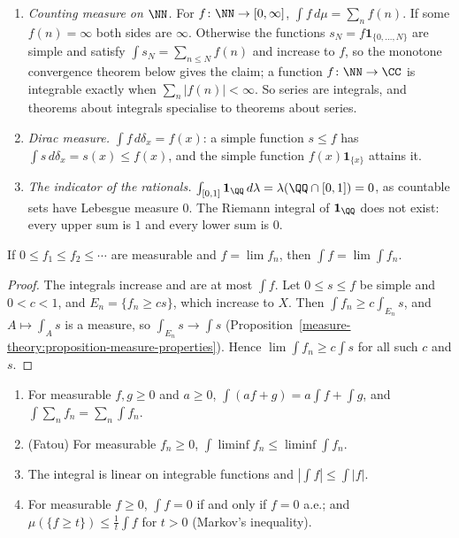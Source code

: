 \begin{example}\label{measure-theory:example-integrals}
\begin{enumerate}
\item \emph{Counting measure on $\NN$.} For $f \colon \NN \to [0, \infty]$, $\int f\,d\mu = \sum_nf(n)$. If some $f(n) = \infty$ both sides are $\infty$. Otherwise the functions $s_N = f\mathbf{1}_{\{0, \ldots, N\}}$ are simple and satisfy $\int s_N = \sum_{n \leq N}f(n)$ and increase to $f$, so the monotone convergence theorem below gives the claim; a function $f \colon \NN \to \CC$ is integrable
exactly when $\sum_n|f(n)| < \infty$. So series are integrals, and theorems about integrals specialise to theorems about series.
\item \emph{Dirac measure.} $\int f\,d\delta_x = f(x)$: a simple function $s \leq f$ has $\int s\,d\delta_x = s(x) \leq f(x)$, and the simple function $f(x)\mathbf{1}_{\{x\}}$ attains it.
\item \emph{The indicator of the rationals.} $\int_{[0, 1]}\mathbf{1}_\QQ\,d\lambda = \lambda(\QQ \cap [0, 1]) = 0$, as countable sets have Lebesgue measure $0$. The Riemann integral of $\mathbf{1}_\QQ$ does
not exist: every upper sum is $1$ and every lower sum is $0$.
\end{enumerate}
\end{example}

\begin{theorem}\label{measure-theory:theorem-monotone-convergence}
If $0 \leq f_1 \leq f_2 \leq \cdots$ are measurable and $f = \lim f_n$, then $\int f = \lim\int f_n$.
\end{theorem}

\begin{proof}
The integrals increase and are at most $\int f$. Let $0 \leq s \leq f$ be simple and $0 < c < 1$, and $E_n = \{f_n \geq cs\}$, which increase to $X$. Then $\int f_n \geq c\int_{E_n}s$, and
$A \mapsto \int_As$ is a measure, so $\int_{E_n}s \to \int s$ (Proposition~\ref{measure-theory:proposition-measure-properties}). Hence $\lim\int f_n \geq c\int s$ for all such $c$ and $s$.
\end{proof}

\begin{corollary}\label{measure-theory:corollary-integral-properties}
\begin{enumerate}
\item For measurable $f, g \geq 0$ and $a \geq 0$, $\int(af + g) = a\int f + \int g$, and $\int\sum_nf_n = \sum_n\int f_n$.
\item (Fatou) For measurable $f_n \geq 0$, $\int\liminf f_n \leq \liminf\int f_n$.
\item The integral is linear on integrable functions and $|\int f| \leq \int|f|$.
\item For measurable $f \geq 0$, $\int f = 0$ if and only if $f = 0$ a.e.; and $\mu(\{f \geq t\}) \leq \frac1t\int f$ for $t > 0$ (Markov's inequality).
\end{enumerate}
\end{corollary}


